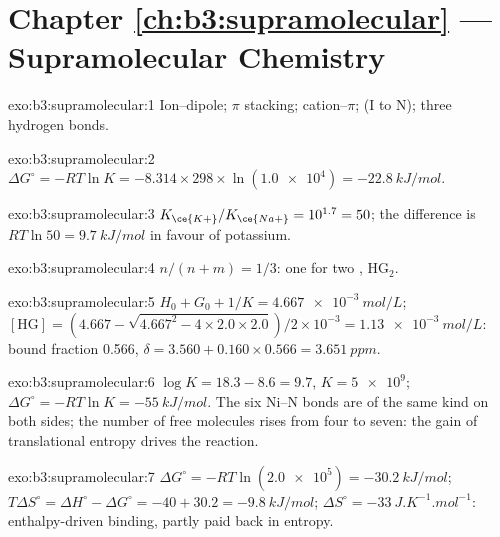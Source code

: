 \section*{Chapter \ref{ch:b3:supramolecular} --- Supramolecular Chemistry}

\begin{solution}{exo:b3:supramolecular:1}
Ion--dipole; $\pi$ stacking; cation--$\pi$;  (I to N); three hydrogen bonds.
\end{solution}

\begin{solution}{exo:b3:supramolecular:2}
$\Delta G^\circ = -RT\ln K = -8.314 \times 298 \times \ln(\num{1.0e4}) = \qty{-22.8}{kJ/mol}$.
\end{solution}

\begin{solution}{exo:b3:supramolecular:3}
$K_{\ce{K+}}/K_{\ce{Na+}} = 10^{1.7} = 50$; the difference is $RT\ln 50 = \qty{9.7}{kJ/mol}$ in favour of potassium.
\end{solution}

\begin{solution}{exo:b3:supramolecular:4}
$n/(n + m) = 1/3$: one  for two , $\mathrm{HG_2}$.
\end{solution}

\begin{solution}{exo:b3:supramolecular:5}
$H_0 + G_0 + 1/K = \qty{4.667e-3}{mol/L}$; $[\mathrm{HG}] = (4.667 - \sqrt{4.667^2 - 4 \times 2.0 \times 2.0})/2 \times 10^{-3} = \qty{1.13e-3}{mol/L}$: bound
fraction 0.566, $\delta = 3.560 + 0.160 \times 0.566 = \qty{3.651}{ppm}$.
\end{solution}

\begin{solution}{exo:b3:supramolecular:6}
$\log K = 18.3 - 8.6 = 9.7$, $K = \num{5e9}$; $\Delta G^\circ = -RT\ln K = \qty{-55}{kJ/mol}$. The six Ni--N bonds are of
the same kind on both sides; the number of free molecules rises from four to
seven: the gain of translational entropy drives the reaction.
\end{solution}

\begin{solution}{exo:b3:supramolecular:7}
$\Delta G^\circ = -RT\ln(\num{2.0e5}) = \qty{-30.2}{kJ/mol}$; $T\Delta S^\circ = \Delta H^\circ - \Delta G^\circ = -40 + 30.2 = \qty{-9.8}{kJ/mol}$;
$\Delta S^\circ = \qty{-33}{J.K^{-1}.mol^{-1}}$: enthalpy-driven binding, partly paid back in entropy.
\end{solution}

